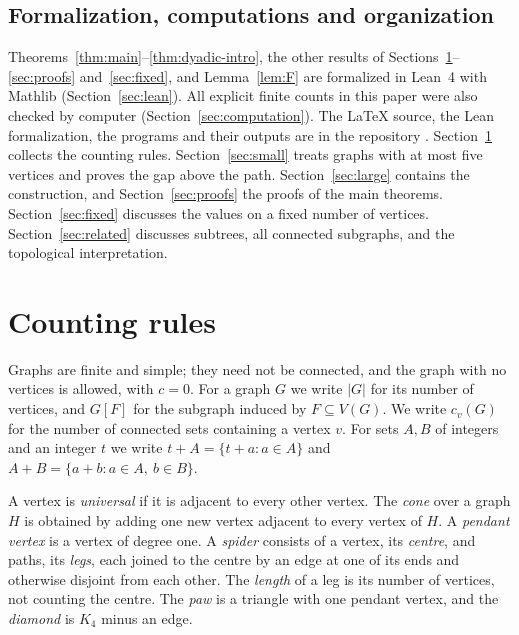 \documentclass[11pt]{amsart}
\theoremstyle{definition}
\theoremstyle{remark}
\begin{document}
\subsection{Formalization, computations and organization}

Theorems~\ref{thm:main}--\ref{thm:dyadic-intro}, the other results of Sections~\ref{sec:rules}--\ref{sec:proofs} and~\ref{sec:fixed}, and Lemma~\ref{lem:F} are formalized in Lean~4 with Mathlib (Section~\ref{sec:lean}). All explicit finite counts in this paper were also checked by computer (Section~\ref{sec:computation}). The \LaTeX{} source, the Lean formalization, the programs and their outputs are in the repository \cite{GRep}. Section~\ref{sec:rules} collects the counting rules. Section~\ref{sec:small} treats graphs with at most five vertices and proves the gap above the path. Section~\ref{sec:large} contains the construction, and Section~\ref{sec:proofs} the proofs of the main theorems. Section~\ref{sec:fixed} discusses the values on a fixed number of vertices. Section~\ref{sec:related} discusses subtrees, all connected subgraphs, and the topological interpretation.

\section{Counting rules}\label{sec:rules}

Graphs are finite and simple; they need not be connected, and the graph with no vertices is allowed, with $c=0$. For a graph $G$ we write $|G|$ for its number of vertices, and $G[F]$ for the subgraph induced by $F\subseteq V(G)$. We write $c_v(G)$ for the number of connected sets containing a vertex $v$. For sets $A,B$ of integers and an integer $t$ we write $t+A=\{t+a:a\in A\}$ and $A+B=\{a+b:a\in A,\ b\in B\}$.

A vertex is \emph{universal} if it is adjacent to every other vertex. The \emph{cone} over a graph $H$ is obtained by adding one new vertex adjacent to every vertex of $H$. A \emph{pendant vertex} is a vertex of degree one. A \emph{spider} consists of a vertex, its \emph{centre}, and paths, its \emph{legs}, each joined to the centre by an edge at one of its ends and otherwise disjoint from each other. The \emph{length} of a leg is its number of vertices, not counting the centre. The \emph{paw} is a triangle with one pendant vertex, and the \emph{diamond} is $K_4$ minus an edge.
\end{document}
